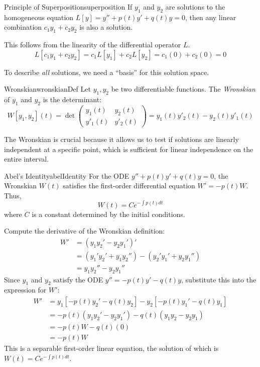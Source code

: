 \documentclass{book}
\newenvironment{Proof}[1][]
  {\begin{ProofTcb}[#1]}
  {\end{ProofTcb}}
\begin{document}
\begin{thm}{Principle of Superposition}{superposition}
    If $y_1$ and $y_2$ are solutions to the homogeneous equation $L[y] = y'' + p(t)y' + q(t)y = 0$, then any linear combination $c_1 y_1 + c_2 y_2$ is also a solution.
\end{thm}

\begin{Proof}
    This follows from the linearity of the differential operator $L$.
    \[
        L[c_1 y_1 + c_2 y_2] = c_1 L[y_1] + c_2 L[y_2] = c_1(0) + c_2(0) = 0
    \]
\end{Proof}

To describe \emph{all} solutions, we need a ``basis'' for this solution space.

\begin{defn}{Wronskian}{wronskianDef}
    Let $y_1, y_2$ be two differentiable functions. The \emph{Wronskian} of $y_1$ and $y_2$ is the determinant:
    \[
        W[y_1, y_2](t) = \det \begin{pmatrix} y_1(t) & y_2(t) \\ y'_1(t) & y'_2(t) \end{pmatrix} = y_1(t)y'_2(t) - y_2(t)y'_1(t)
    \]
\end{defn}

The Wronskian is crucial because it allows us to test if solutions are linearly independent at a specific point, which is sufficient for linear independence on the entire interval.

\begin{thm}{Abel's Identity}{abelIdentity}
    For the ODE $y'' + p(t)y' + q(t)y = 0$, the Wronskian $W(t)$ satisfies the first-order differential equation $W' = -p(t)W$. Thus,
    \[
        W(t) = C e^{-\int p(t)dt}
    \]
    where $C$ is a constant determined by the initial conditions.
\end{thm}

\begin{Proof}
    Compute the derivative of the Wronskian definition:
    \begin{align*}
        W' &= (y_1 y_2' - y_2 y_1')' \\
        &= (y_1' y_2' + y_1 y_2'') - (y_2' y_1' + y_2 y_1'') \\
        &= y_1 y_2'' - y_2 y_1''
    \end{align*}
    Since $y_1$ and $y_2$ satisfy the ODE $y'' = -p(t)y' - q(t)y$, substitute this into the expression for $W'$:
    \begin{align*}
        W' &= y_1[-p(t)y_2' - q(t)y_2] - y_2[-p(t)y_1' - q(t)y_1] \\
        &= -p(t)(y_1 y_2' - y_2 y_1') - q(t)(y_1 y_2 - y_2 y_1) \\
        &= -p(t)W - q(t)(0) \\
        &= -p(t)W
    \end{align*}
    This is a separable first-order linear equation, the solution of which is $W(t) = Ce^{-\int p(t)dt}$.
\end{Proof}
\end{document}
